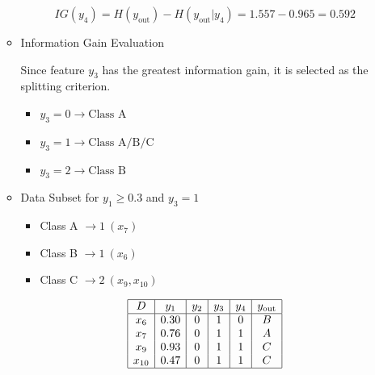 \documentclass[12pt]{article}
\begin{document}
\begin{enumerate}[leftmargin=\labelsep, label=\textbf{\arabic*.)}]
\begin{itemize}
                    \[
                        IG(y_4) = H(y_{\text{out}}) - H(y_{\text{out}}|y_4) = 1.557 - 0.965 = 0.592
                    \]

              \item Information Gain Evaluation

                    Since feature \( y_3 \) has the greatest information gain, it is selected as the splitting criterion.

                    \begin{itemize}
                        \item \( y_3 = 0 \rightarrow \text{Class A} \)
                        \item \( y_3 = 1 \rightarrow \text{Class A/B/C} \)
                        \item \( y_3 = 2 \rightarrow \text{Class B} \)
                    \end{itemize}

              \item Data Subset for \( y_1 \geq 0.3 \) and \( y_3 = 1 \) \\
                    \vspace{0.5em}
                    \begin{minipage}{0.30\textwidth}
                        \begin{itemize}
                            \item Class A $\rightarrow 1 \ (x_7)$
                            \item Class B $\rightarrow 1 \ (x_6)$
                            \item Class C $\rightarrow 2 \ (x_9, x_{10})$
                        \end{itemize}
                    \end{minipage}
                    \begin{minipage}{0.45\textwidth}
                        \[
                            \begin{array}{|c|c|c|c|c|c|}
                                \hline
                                D      & y_1  & y_2 & y_3 & y_4 & y_{\text{out}} \\
                                \hline
                                x_6    & 0.30 & 0   & 1   & 0   & B              \\
                                x_7    & 0.76 & 0   & 1   & 1   & A              \\
                                x_9    & 0.93 & 0   & 1   & 1   & C              \\
                                x_{10} & 0.47 & 0   & 1   & 1   & C              \\
                                \hline
                            \end{array}
                        \]
                    \end{minipage}


\end{itemize}
\end{enumerate}
\end{document}
